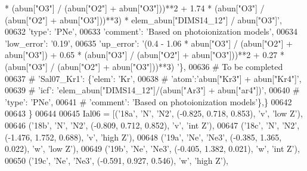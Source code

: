 \begin{DoxyCode}
{       * (abun["O3"] / (abun["O2"] + abun["O3"]))**2 + 1.74 * (abun["O3"] / (abun["O2"] + abun["O3"]))**3) *
       elem\_abun["DIMS14\_12"] / abun["O3"]'},
00632                                        \textcolor{stringliteral}{'type'}: \textcolor{stringliteral}{'PNe'},
00633                                        \textcolor{stringliteral}{'comment'}: \textcolor{stringliteral}{'Based on photoionization models'},
00634                                        \textcolor{stringliteral}{'low\_error'}: \textcolor{stringliteral}{'0.19'},
00635                                        \textcolor{stringliteral}{'up\_error'}: \textcolor{stringliteral}{'(0.4 - 1.06 * abun["O3"] / (abun["O2"] + abun["O3"]) +
       0.65 * (abun["O3"] / (abun["O2"] + abun["O3"]))**2 + 0.27 * (abun["O3"] / (abun["O2"] + abun["O3"]))**3) '}\},
00636 \textcolor{comment}{# To be completed}
00637 \textcolor{comment}{#                         'Sal07\_Kr1': \{'elem': 'Kr',}
00638 \textcolor{comment}{#                                       'atom':'abun["Kr3"] + abun["Kr4"]', }
00639 \textcolor{comment}{#                                       'icf': 'elem\_abun["DIMS14\_12"]/(abun["Ar3"] + abun["ar4"])',}
00640 \textcolor{comment}{#                                       'type': 'PNe',}
00641 \textcolor{comment}{#                                       'comment': 'Based on photoionization models'\},\}}
00642                          
00643                          \}
00644         
00645         Ial06 = [(\textcolor{stringliteral}{'18a'}, \textcolor{stringliteral}{'N'}, \textcolor{stringliteral}{'N2'}, (-0.825, 0.718, 0.853), \textcolor{stringliteral}{'v'}, \textcolor{stringliteral}{'low Z'}),
00646                  (\textcolor{stringliteral}{'18b'}, \textcolor{stringliteral}{'N'}, \textcolor{stringliteral}{'N2'}, (-0.809, 0.712, 0.852), \textcolor{stringliteral}{'v'}, \textcolor{stringliteral}{'int Z'}),
00647                  (\textcolor{stringliteral}{'18c'}, \textcolor{stringliteral}{'N'}, \textcolor{stringliteral}{'N2'}, (-1.476, 1.752, 0.688), \textcolor{stringliteral}{'v'}, \textcolor{stringliteral}{'high Z'}),
00648                  (\textcolor{stringliteral}{'19a'}, \textcolor{stringliteral}{'Ne'}, \textcolor{stringliteral}{'Ne3'}, (-0.385, 1.365, 0.022), \textcolor{stringliteral}{'w'}, \textcolor{stringliteral}{'low Z'}),
00649                  (\textcolor{stringliteral}{'19b'}, \textcolor{stringliteral}{'Ne'}, \textcolor{stringliteral}{'Ne3'}, (-0.405, 1.382, 0.021), \textcolor{stringliteral}{'w'}, \textcolor{stringliteral}{'int Z'}),
00650                  (\textcolor{stringliteral}{'19c'}, \textcolor{stringliteral}{'Ne'}, \textcolor{stringliteral}{'Ne3'}, (-0.591, 0.927, 0.546), \textcolor{stringliteral}{'w'}, \textcolor{stringliteral}{'high Z'}),

\end{DoxyCode}
